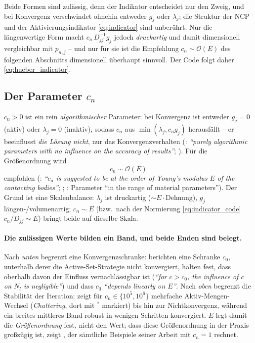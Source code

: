 \documentclass[a4paper,11pt]{article}
\def\tilde#1{#1}%
\begin{document}
Beide Formen sind zulässig, denn der Indikator entscheidet nur den Zweig, und bei Konvergenz
verschwindet ohnehin entweder $\tilde g_j$ oder $\lambda_j$; die Struktur der NCP und der
Aktivierungsindikator \eqref{eq:indicator} sind unberührt. Nur die längenwertige Form macht
$c_n\,\tilde D_{jj}^{-1}\tilde g_j$ jedoch \emph{druckartig} und damit dimensionell vergleichbar mit
$p_{n,j}$ -- und nur für sie ist die Empfehlung $c_n\sim\mathcal O(E)$ des folgenden Abschnitts
dimensionell überhaupt sinnvoll. Der Code folgt daher \eqref{eq:hueber_indicator}.

\subsection{Der Parameter $c_n$}
$c_n>0$ ist ein rein \emph{algorithmischer} Parameter: bei Konvergenz ist entweder $\tilde g_j=0$
(aktiv) oder $\lambda_j=0$ (inaktiv), sodass $c_n$ aus $\min(\lambda_j,c_n\tilde g_j)$
herausfällt -- er beeinflusst \emph{die Lösung nicht}, nur das Konvergenzverhalten
(\citealp[S.~565]{gitterle}: \emph{``purely algorithmic parameters with no influence on the accuracy of
results''}; \citealp[S.~38]{farah}). Für die Größenordnung wird
\begin{equation}
c_n \sim \mathcal O(E)
\end{equation}
empfohlen (\citealp[S.~1367]{poppgeewall2009}: \emph{``$c_{\mathrm n}$ is suggested to be at the order
of Young's modulus $E$ of the contacting bodies''}; \citealp[S.~38]{farah}; \citealp[S.~565]{gitterle}:
Parameter ``in the range of material parameters''). Der Grund ist eine Skalenbalance: $\lambda_j$
ist druckartig ($\sim E\cdot$Dehnung), $\tilde g_j$ längen-/volumenartig; $c_n\sim E$ (bzw.\ nach der
Normierung \eqref{eq:indicator_code} $c_n/\tilde D_{jj}\sim E$) bringt beide auf dieselbe Skala.

\paragraph{Die zulässigen Werte bilden ein Band, und beide Enden sind belegt.}
Nach \emph{unten} begrenzt eine Konvergenzschranke: \citet[Abschn.~7, Tab.~7]{hueber2005} berichten
eine Schranke $c_0$, unterhalb derer die Active-Set-Strategie nicht konvergiert, halten fest, dass
oberhalb davon der Einfluss vernachlässigbar ist (\emph{``for $c>c_0$, the influence of $c$ on $N_l$
is negligible''}) und dass $c_0$ \emph{``depends linearly on $E$''}. Nach \emph{oben} begrenzt die
Stabilität der Iteration: \citet[Tab.~I, S.~565]{gitterle} zeigt für $c_n\in\{10^5,10^6\}$ mehrfache
Aktiv-Mengen-Wechsel (\emph{Chattering}, dort mit $^*$ markiert) bis hin zur Nichtkonvergenz, während
ein breites mittleres Band robust in wenigen Schritten konvergiert. $E$ legt damit die
\emph{Größenordnung} fest, nicht den Wert; dass diese Größenordnung in der Praxis großzügig ist,
zeigt \citet[S.~38]{farah}, der sämtliche Beispiele seiner Arbeit mit $c_n=1$ rechnet.
\end{document}
